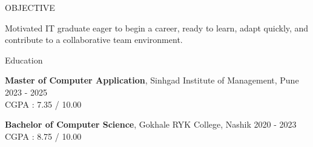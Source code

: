 \documentclass{resume} %
\begin{document}

\begin{rSection}{OBJECTIVE}

{Motivated IT graduate eager to begin a career, ready to learn, adapt quickly, and contribute to a collaborative team environment.}


\end{rSection}

\begin{rSection}{Education}

{\bf Master of Computer Application}, Sinhgad Institute of Management, Pune \hfill {2023 - 2025}\\
CGPA : 7.35 / 10.00

{\bf Bachelor of Computer Science}, Gokhale RYK College, Nashik \hfill {2020 - 2023}\\
CGPA : 8.75 / 10.00


\end{rSection}


\end{document}

